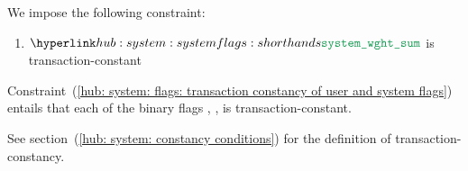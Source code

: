 We impose the following constraint:
\begin{enumerate}
	\item \label{hub: system: flags: transaction constancy of user and system flags}
		$\weightedFlagSum$ is transaction-constant
\end{enumerate}
\saNote{}\label{hub: system: flags: individual flags are transaction constant}
Constraint~(\ref{hub: system: flags: transaction constancy of user and system flags})
entails that each of the binary flags
\sysi{},
\user{},
\sysf{}
is transaction-constant.

\saNote{}
See section~(\ref{hub: system: constancy conditions}) for the definition of transaction-constancy.
